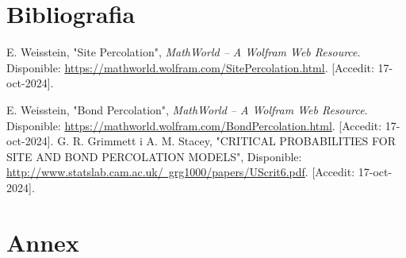 \documentclass[a4paper]{article}
\begin{document}
	\newpage
	\section{Bibliografia}
	
	\renewcommand{\refname}{}	
	\begin{thebibliography}{99}
		\vspace{-2em}
		 E. Weisstein, "Site Percolation", \textit{MathWorld -- A Wolfram Web Resource}. Disponible: \href{https://mathworld.wolfram.com/SitePercolation.html}{https://mathworld.wolfram.com/SitePercolation.html}. [Accedit: 17-oct-2024].
		
		 E. Weisstein, "Bond Percolation", \textit{MathWorld -- A Wolfram Web Resource}. Disponible: \href{https://mathworld.wolfram.com/BondPercolation.html}{https://mathworld.wolfram.com/BondPercolation.html}. [Accedit: 17-oct-2024].
		 G. R. Grimmett i A. M. Stacey, "CRITICAL PROBABILITIES FOR SITE
		AND BOND PERCOLATION MODELS", Disponible: \href{http://www.statslab.cam.ac.uk/~grg1000/papers/UScrit6.pdf}{http://www.statslab.cam.ac.uk/~grg1000/papers/UScrit6.pdf}. [Accedit: 17-oct-2024].
	
	\end{thebibliography}
	
	\newpage
	\section{Annex}
	
	
\end{document}
